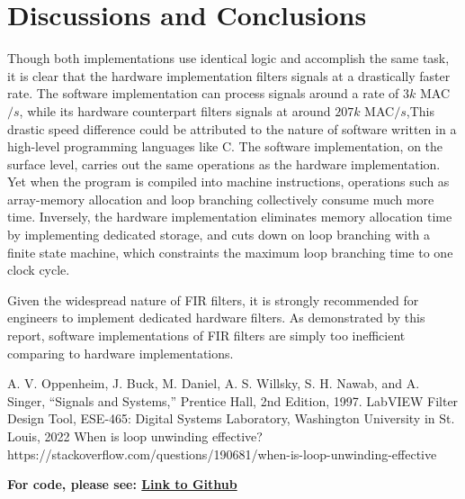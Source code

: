\documentclass[conference]{IEEEtran}
\begin{document}
\section{Discussions and Conclusions} \label{conclusion}

Though both implementations use identical logic and accomplish the same task, it is clear that the hardware implementation filters signals at a drastically faster rate. The software implementation can process signals around a rate of $3k$ MAC$/s$, while its hardware counterpart filters signals at around $207k$ MAC$/s$,This drastic speed difference could be attributed to the nature of software written in a high-level programming languages like C. The software implementation, on the surface level, carries out the same operations as the hardware implementation. Yet when the program is compiled into machine instructions, operations such as array-memory allocation and loop branching collectively consume much more time. Inversely, the hardware implementation eliminates memory allocation time by implementing dedicated storage, and cuts down on loop branching with a finite state machine, which constraints the maximum loop branching time to one clock cycle. 

Given the widespread nature of FIR filters, it is strongly recommended for engineers to implement dedicated hardware filters. As demonstrated by this report, software implementations of FIR filters are simply too inefficient comparing to hardware implementations.


\begin{thebibliography}{00}
 A. V. Oppenheim, J. Buck, M. Daniel, A. S. Willsky, S. H. Nawab, and A. Singer, ``Signals and Systems,'' Prentice Hall, 2nd Edition, 1997.
 LabVIEW Filter Design Tool, ESE-465: Digital Systems Laboratory, Washington University in St. Louis, 2022
 When is loop unwinding effective?\\ https://stackoverflow.com/questions/190681/when-is-loop-unwinding-effective
\end{thebibliography}

\textbf{For code, please see: \href{https://github.com/WillWu88/FPGA_Project_Reports/tree/main/Code/Filter}{Link to Github}}
\end{document}

